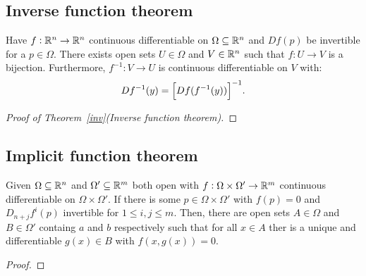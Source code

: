 \documentclass[../Year2.tex]{subfiles}
\begin{document}
\subsection{Inverse function theorem}

\begin{theorem}\label{inv}
    Have $f:\mathbb{R}^n\rightarrow \mathbb{R}^n$ continuous differentiable on $\Omega\subseteq\mathbb{R}^n$ and $Df(p)$ be invertible for a $p\in\Omega$. There exists open sets $U\in\Omega$ and $V\in\mathbb{R}^n$ such that $f:U\rightarrow V$ is a bijection. Furthermore, $f^{-1}:V\rightarrow U$ is continuous differentiable on $V$ with: \[
        Df^{-1}(y)={\left[Df(f^{-1}(y))\right]}^{-1}\text{\textcolor{black}{.}}
    \]
    \vspace{-20pt}
\end{theorem}

\begin{lemma}
    
\end{lemma}

\begin{lemma}
    
\end{lemma}

\begin{lemma}
    
\end{lemma}

\begin{corollary}
    
\end{corollary}

\begin{lemma}
    
\end{lemma}

\begin{proof}[Proof of Theorem~\ref{inv}(Inverse function theorem)]
    
\end{proof}

\subsection{Implicit function theorem}

\begin{theorem}
    Given $\Omega\subseteq\mathbb{R}^n$ and $\Omega'\subseteq\mathbb{R}^m$ both open with $f:\Omega\times\Omega'\rightarrow\mathbb{R}^m$ continuous differentiable on $\Omega\times\Omega'$. If there is some $p\in\Omega\times\Omega'$ with $f(p)=0$ and $D_{n+j}f^i(p)$ invertible for $1\leq i, j\leq m$. Then, there are open sets $A\in\Omega$ and $B\in\Omega'$ containg $a$ and $b$ respectively such that for all $x\in A$ ther is a unique and differentiable $g(x)\in B$ with $f(x,g(x))=0$.
    \begin{proof}
        
    \end{proof}
\end{theorem}
\end{document}
